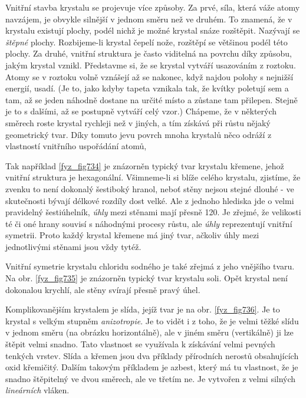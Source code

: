 {    Vnitřní stavba krystalu se projevuje více způsoby. Za prvé, síla, která váže atomy navzájem, je 
    obvykle silnější v jednom směru než ve druhém. To znamená, že v krystalu existují plochy, podél 
    nichž je možné krystal snáze rozštěpit. Nazývají se \emph{štěpné} plochy. Rozbijeme-li krystal 
    čepelí nože, rozštěpí se většinou podél této plochy. Za druhé, vnitřní struktura je často 
    viditelná na povrchu díky způsobu, jakým krystal vznikl. Představme si, že se krystal vytváří 
    usazováním z roztoku. Atomy se v roztoku volně vznášejí až se nakonec, když najdou polohy s 
    nejnižší energií, usadí. (Je to, jako kdyby tapeta vznikala tak, že kvítky poletují sem a tam, 
    až se jeden náhodně dostane na určité místo a zůstane tam přilepen. Stejně je to s dalšími, až 
    se postupně vytváří celý vzor.) Chápeme, že v některých směrech roste krystal rychleji než v 
    jiných, a tím získává při růstu nějaký geometrický tvar. Díky tomuto jevu povrch mnoha krystalů 
    něco odráží z vlastností vnitřního uspořádání atomů,
    
    Tak například \ref{fyz_fig734} je znázorněn typický tvar krystalu křemene, jehož vnitřní 
    struktura je hexagonální. Všimneme-li si blíže celého krystalu, zjistíme, že zvenku to není 
    dokonalý šestiboký hranol, neboť stěny nejsou stejné dlouhé - ve skutečnosti bývají délkové 
    rozdíly dost velké. Ale z jednoho hlediska jde o velmi pravidelný šestiúhelník, \emph{úhly} 
    mezi stěnami mají přesně \SI{120}{\deg}. Je zřejmé, že velikosti té či oné hrany souvisí s 
    náhodnými procesy růstu, ale \emph{úhly} reprezentují vnitřní symetrii. Proto každý krystal 
    křemene má jiný tvar, ačkoliv úhly mezi jednotlivými stěnami jsou vždy tytéž. 
    
    Vnitřní symetrie krystalu chloridu sodného je také zřejmá z jeho vnějšího tvaru. Na obr. 
    \ref{fyz_fig735} je znázorněn typický tvar krystalu soli. Opět krystal není dokonalou krychlí, 
    ale stěny svírají přesně pravý úhel. 
    
    Komplikovanějším krystalem je slída, jejíž tvar je na obr. \ref{fyz_fig736}. Je to krystal s 
    velkým stupněm \emph{anizotropie}. Je to vidět i z toho, že je velmi těžké slídu v jednom směru 
    (na obrázku horizontálně), ale v jiném směru (vertikálně) ji lze štěpit velmi snadno. Tato 
    vlastnost se využívala k získávání velmi pevných tenkých vrstev. Slída a křemen jsou dva 
    příklady přírodních nerostů obsahujících oxid křemičitý. Dalším takovým příkladem je azbest, 
    který má tu vlastnost, že je snadno štěpitelný ve dvou směrech, ale ve třetím ne. Je vytvořen z 
    velmi silných \emph{lineárních} vláken. 
    
}
